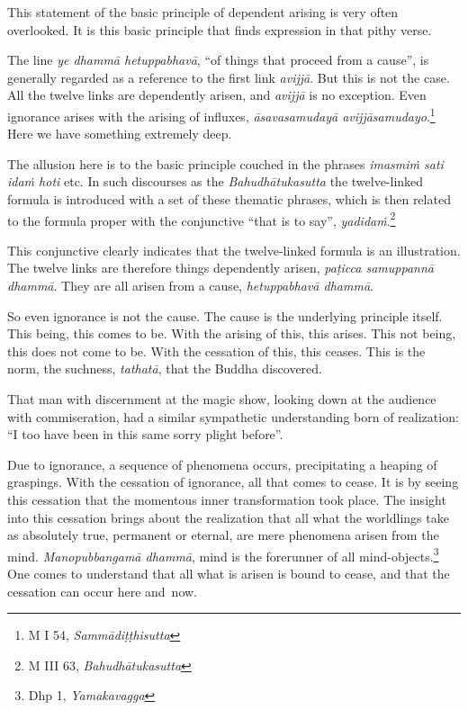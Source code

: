 This statement of the basic principle of dependent arising is very often overlooked. It is this basic principle that finds expression in that pithy verse.

The line \emph{ye dhammā hetuppabhavā}, ``of things that proceed from a cause'', is generally regarded as a reference to the first link \emph{avijjā}. But this is not the case. All the twelve links are dependently arisen, and \emph{avijjā} is no exception. Even ignorance arises with the arising of influxes, \emph{āsavasamudayā avijjāsamudayo}.\footnote{M I 54, \emph{Sammādiṭṭhisutta}} Here we have something extremely deep.

The allusion here is to the basic principle couched in the phrases \emph{imasmiṁ sati idaṁ hoti} etc. In such discourses as the \emph{Bahudhātukasutta} the twelve-linked formula is introduced with a set of these thematic phrases, which is then related to the formula proper with the conjunctive ``that is to say'', \emph{yadidaṁ}.\footnote{M III 63, \emph{Bahudhātukasutta}}

This conjunctive clearly indicates that the twelve-linked formula is an illustration. The twelve links are therefore things dependently arisen, \emph{paṭicca samuppannā dhammā}. They are all arisen from a cause, \emph{hetuppabhavā dhammā}.

So even ignorance is not the cause. The cause is the underlying principle itself. This being, this comes to be. With the arising of this, this arises. This not being, this does not come to be. With the cessation of this, this ceases. This is the norm, the suchness, \emph{tathatā}, that the Buddha discovered.

That man with discernment at the magic show, looking down at the audience with commiseration, had a similar sympathetic understanding born of realization: ``I too have been in this same sorry plight before''.

Due to ignorance, a sequence of phenomena occurs, precipitating a heaping of graspings. With the cessation of ignorance, all that comes to cease. It is by seeing this cessation that the momentous inner transformation took place. The insight into this cessation brings about the realization that all what the worldlings take as absolutely true, permanent or eternal, are mere phenomena arisen from the mind. \emph{Manopubbangamā dhammā}, mind is the forerunner of all mind-objects.\footnote{Dhp 1, \emph{Yamakavagga}} One comes to understand that all what is arisen is bound to cease, and that the cessation can occur here and~now.

